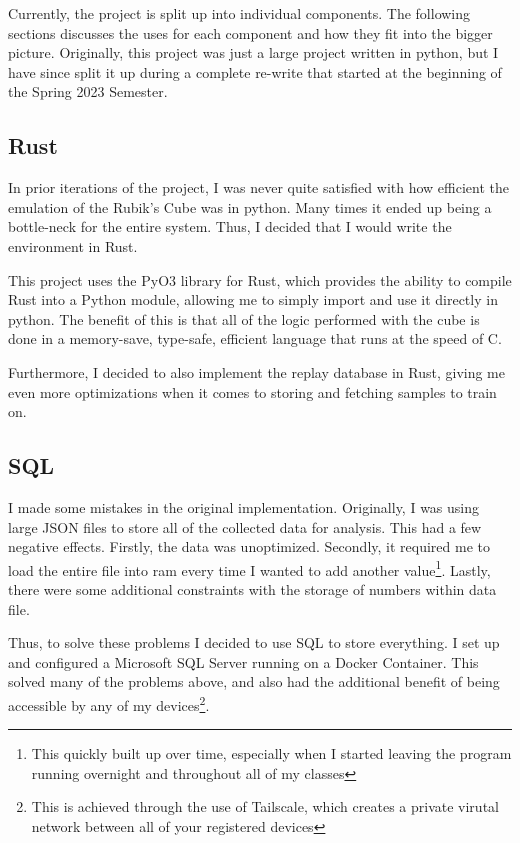 \documentclass[12pt]{article}
\begin{document}
Currently, the project is split up into individual components. The following sections discusses the uses for each component and how they fit into the bigger picture. Originally, this project was just a large project written in python, but I have since split it up during a complete re-write that started at the beginning of the Spring 2023 Semester.

\subsection{Rust}

In prior iterations of the project, I was never quite satisfied with how efficient the emulation of the Rubik's Cube was in python. Many times it ended up being a bottle-neck for the entire system. Thus, I decided that I would write the environment in Rust. 

This project uses the PyO3 library for Rust, which provides the ability to compile Rust into a Python module, allowing me to simply import and use it directly in python. The benefit of this is that all of the logic performed with the cube is done in a memory-save, type-safe, efficient language that runs at the speed of C. 

Furthermore, I decided to also implement the replay database in Rust, giving me even more optimizations when it comes to storing and fetching samples to train on.

\subsection{SQL}

I made some mistakes in the original implementation. Originally, I was using large JSON files to store all of the collected data for analysis. This had a few negative effects. Firstly, the data was unoptimized. Secondly, it required me to load the entire file into ram every time I wanted to add another value\footnote{This quickly built up over time, especially when I started leaving the program running overnight and throughout all of my classes}. Lastly, there were some additional constraints with the storage of numbers within data file.

Thus, to solve these problems I decided to use SQL to store everything. I set up and configured a Microsoft SQL Server running on a Docker Container. This solved many of the problems above, and also had the additional benefit of being accessible by any of my devices\footnote{This is achieved through the use of Tailscale, which creates a private virutal network between all of your registered devices}.
\end{document}
